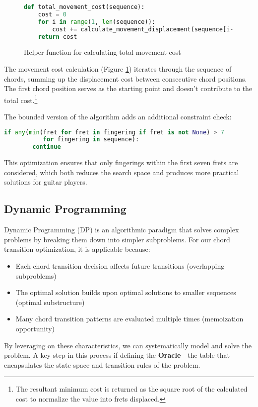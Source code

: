 \documentclass[conference]{IEEEtran}
\begin{document}
\begin{figure}[H]
\begin{lstlisting}[language=Python]
def total_movement_cost(sequence):
    cost = 0
    for i in range(1, len(sequence)):
        cost += calculate_movement_displacement(sequence[i-1], sequence[i])
    return cost 
\end{lstlisting}
\caption{Helper function for calculating total movement cost}
\label{fig:BruteForceCost}
\end{figure}

The movement cost calculation (Figure \ref{fig:BruteForceCost}) iterates through the sequence of chords, summing up the displacement cost between consecutive chord positions. The first chord position serves as the starting point and doesn't contribute to the total cost.\footnote{The resultant minimum cost is returned as the square root of the calculated cost to normalize the value into frets displaced.}

The bounded version of the algorithm adds an additional constraint check:
\begin{lstlisting}[language=Python]
    if any(min(fret for fret in fingering if fret is not None) > 7 
           for fingering in sequence):
        continue
\end{lstlisting}

This optimization ensures that only fingerings within the first seven frets are considered, which both reduces the search space and produces more practical solutions for guitar players.

\subsection{Dynamic Programming}
Dynamic Programming (DP) is an algorithmic paradigm that solves complex problems by breaking them down into simpler subproblems. For our chord transition optimization, it is applicable because:
\begin{itemize}
    \item Each chord transition decision affects future transitions (overlapping subproblems)
    \item The optimal solution builds upon optimal solutions to smaller sequences (optimal substructure)
    \item Many chord transition patterns are evaluated multiple times (memoization opportunity)
\end{itemize}

By leveraging on these characteristics, we can systematically model and solve the problem. A key step in this process if defining the \textbf{Oracle} - the table that encapsulates the state space and transition rules of the problem.
\end{document}
